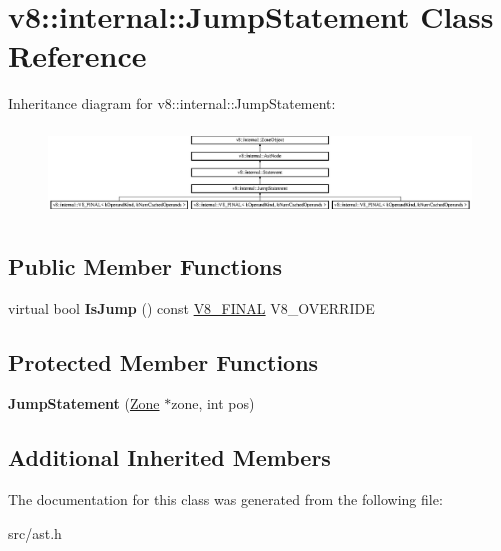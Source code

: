 \hypertarget{classv8_1_1internal_1_1_jump_statement}{}\section{v8\+:\+:internal\+:\+:Jump\+Statement Class Reference}
\label{classv8_1_1internal_1_1_jump_statement}
Inheritance diagram for v8\+:\+:internal\+:\+:Jump\+Statement\+:\begin{figure}[H]
\begin{center}
\leavevmode
\includegraphics[height=2.380952cm]{classv8_1_1internal_1_1_jump_statement}
\end{center}
\end{figure}
\subsection*{Public Member Functions}
\begin{DoxyCompactItemize}
\item 
\hypertarget{classv8_1_1internal_1_1_jump_statement_a3091a6345d0cf1bd6ae016ee40de4e59}{}virtual bool {\bfseries Is\+Jump} () const \hyperlink{classv8_1_1internal_1_1_v8___f_i_n_a_l}{V8\+\_\+\+F\+I\+N\+A\+L} V8\+\_\+\+O\+V\+E\+R\+R\+I\+D\+E\label{classv8_1_1internal_1_1_jump_statement_a3091a6345d0cf1bd6ae016ee40de4e59}

\end{DoxyCompactItemize}
\subsection*{Protected Member Functions}
\begin{DoxyCompactItemize}
\item 
\hypertarget{classv8_1_1internal_1_1_jump_statement_af3cdf4deada148879280335ccd003190}{}{\bfseries Jump\+Statement} (\hyperlink{classv8_1_1internal_1_1_zone}{Zone} $\ast$zone, int pos)\label{classv8_1_1internal_1_1_jump_statement_af3cdf4deada148879280335ccd003190}

\end{DoxyCompactItemize}
\subsection*{Additional Inherited Members}


The documentation for this class was generated from the following file\+:\begin{DoxyCompactItemize}
\item 
src/ast.\+h\end{DoxyCompactItemize}

